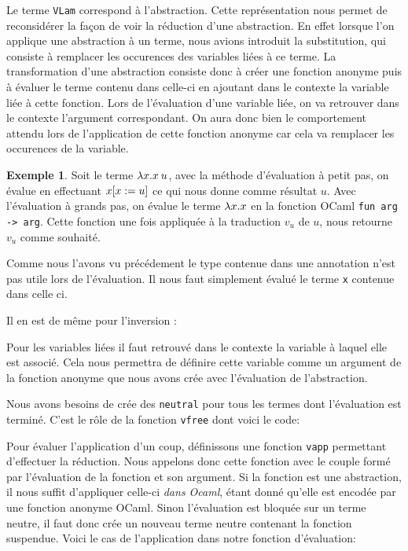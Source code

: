 \documentclass {article}
\newcommand{\codefrom}[3]
           {}
\theoremstyle{definition}
\newtheorem{example}{Exemple}
\theoremstyle{remark}
\newcommand{\fun}[1]{\lstinline!#1!}
\begin{document}
Le terme \fun{VLam} correspond à l'abstraction.
Cette représentation nous permet de reconsidérer la façon de voir la 
réduction d'une abstraction. En effet lorsque l'on applique une abstraction
à un terme, nous avions introduit la substitution, qui consiste à remplacer les occurences 
des variables liées à ce terme. La transformation d'une abstraction consiste donc à 
créer une fonction anonyme puis à évaluer le terme contenu dans celle-ci en ajoutant dans le 
contexte la variable liée à cette fonction. Lors de l'évaluation d'une variable liée, on va
retrouver dans le contexte l'argument correspondant. On aura donc bien le comportement attendu
lors de l'application de cette fonction anonyme car cela va remplacer les occurences de la 
variable.

\begin{example}
  Soit le terme \(\lambda x. x\:u\), avec la méthode
  d'évaluation à petit pas, on évalue en effectuant $x[x := u]$
  ce qui nous donne comme résultat $u$.  Avec l'évaluation à
  grands pas, on évalue le terme $\lambda x. x$ en la fonction OCaml
  \lstinline!fun arg -> arg!. Cette fonction une fois appliquée à la traduction $v_u$ de
  $u$,  nous retourne $v_u$ comme souhaité.
\end{example}


Comme nous l'avons vu précédement le type contenue dans une annotation n'est pas utile lors de l'évaluation.
Il nous faut simplement évalué le terme \fun{x} contenue dans celle ci.
%
\codefrom{typed}{lambda}{big_step_eval_exTm_ann}

Il en est de même pour l'inversion :
\codefrom{typed}{lambda}{big_step_eval_inTm_inv}


Pour les variables liées il faut retrouvé dans le contexte la variable à laquel elle est associé.
Cela nous permettra de définire cette variable comme un argument de la fonction anonyme que nous avons
crée avec l'évaluation de l'abstraction.

\codefrom{typed}{lambda}{big_step_eval_exTm_var}

Nous avons besoins de crée des \fun{neutral} pour
tous les termes dont l'évaluation est terminé. C'est le rôle de la fonction
\fun{vfree} dont voici le code:
\codefrom{typed}{lambda}{vfree}


Pour évaluer l'application d'un coup, définissons une fonction 
\fun{vapp} permettant d'effectuer la réduction.  Nous appelons donc cette fonction avec le couple formé
par l'évaluation de la fonction et son argument.  Si la fonction est une abstraction, il nous suffit d'appliquer celle-ci
\emph{dans Ocaml}, étant donné qu'elle est encodée par une fonction
anonyme OCaml. Sinon l'évaluation est bloquée sur un terme neutre, il faut donc
crée un nouveau terme neutre contenant la fonction suspendue.
Voici le cas de l'application dans notre fonction d'évaluation:
\end{document}

